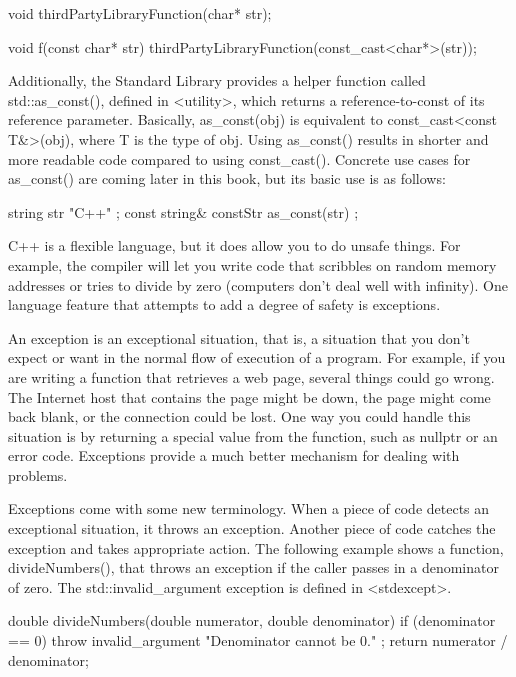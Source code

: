 \begin{cpp}
void thirdPartyLibraryFunction(char* str);

void f(const char* str)
{
    thirdPartyLibraryFunction(const_cast<char*>(str));
}
\end{cpp}

Additionally, the Standard Library provides a helper function called std::as\_const(), defined in <utility>, which returns a reference-to-const of its reference parameter. Basically, as\_const(obj) is equivalent to const\_cast<const T\&>(obj), where T is the type of obj. Using as\_const() results in shorter and more readable code compared to using const\_cast(). Concrete use cases for as\_const() are coming later in this book, but its basic use is as follows:

\begin{cpp}
string str { "C++" };
const string& constStr { as_const(str) };
\end{cpp}


C++ is a flexible language, but it does allow you to do unsafe things. For example, the compiler will let you write code that scribbles on random memory addresses or tries to divide by zero (computers don’t deal well with infinity). One language feature that attempts to add a degree of safety is exceptions.

An exception is an exceptional situation, that is, a situation that you don’t expect or want in the normal flow of execution of a program. For example, if you are writing a function that retrieves a web page, several things could go wrong. The Internet host that contains the page might be down, the page might come back blank, or the connection could be lost. One way you could handle this situation is by returning a special value from the function, such as nullptr or an error code. Exceptions provide a much better mechanism for dealing with problems.

Exceptions come with some new terminology. When a piece of code detects an exceptional situation, it throws an exception. Another piece of code catches the exception and takes appropriate action. The following example shows a function, divideNumbers(), that throws an exception if the caller passes in a denominator of zero. The std::invalid\_argument exception is defined in <stdexcept>.

\begin{cpp}
double divideNumbers(double numerator, double denominator)
{
    if (denominator == 0) {
        throw invalid_argument { "Denominator cannot be 0." };
    }
    return numerator / denominator;
}
\end{cpp}

